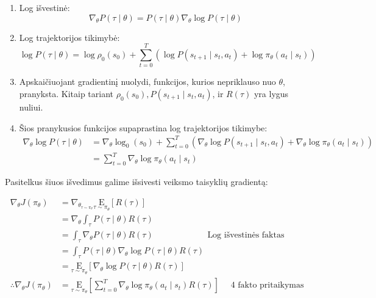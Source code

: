 \documentclass[a4paper, 12pt]{article}
\begin{document}
\begin{enumerate}
  \addtolength{\itemsep}{-0.5\baselineskip} 
  \item Log išvestinė:
\begin{equation}
\nabla_{\theta} P(\tau \mid \theta)=P(\tau \mid \theta) \nabla_{\theta} \log P(\tau \mid \theta)
\end{equation}
  \item Log trajektorijos tikimybė:
\begin{equation}
\log P(\tau \mid \theta)=\log \rho_{0}\left(s_{0}\right)+\sum_{t=0}^{T}\left(\log P\left(s_{t+1} \mid s_{t}, a_{t}\right)+\log \pi_{\theta}\left(a_{t} \mid s_{t}\right)\right)
\end{equation}
  \item Apskaičiuojant gradientinį nuolydi, funkcijos, kurios nepriklauso nuo $\theta$, pranyksta. Kitaip tariant $\rho_{0}\left(s_{0}\right), P\left(s_{t+1} \mid s_{t}, a_{t}\right)$, ir $R(\tau)$ yra lygus nuliui.
 \item Šios pranykusios funkcijos supaprastina log trajektorijos tikimybe:
\begin{equation}
\begin{aligned}
\nabla_{\theta} \log P(\tau \mid \theta) &=\nabla_{\theta} \log _{0}\left(s_{0}\right)+\sum_{t=0}^{T}\left(\nabla_{\theta} \log P\left(s_{t+1} \mid s_{t}, a_{t}\right)+\nabla_{\theta} \log \pi_{\theta}\left(a_{t} \mid s_{t}\right)\right) \\
&=\sum_{t=0}^{T} \nabla_{\theta} \log \pi_{\theta}\left(a_{t} \mid s_{t}\right)
\end{aligned}
\end{equation}
\end{enumerate}

Pasitelkus šiuos išvedimus galime išsivesti veiksmo taisyklių gradientą:

\begin{equation}
\begin{array}{rlr}
\label{megaVeiksmuGradientas}
\nabla_{\theta} J\left(\pi_{\theta}\right) & =\nabla_{\theta_{\tau \sim \pi_{\theta}}} \underset{\tau \sim \pi_{\theta}}{\mathrm{E}}[R(\tau)]  \\
& =\nabla_{\theta} \int_{\tau} P(\tau \mid \theta) R(\tau)  \\
& =\int_{\tau} \nabla_{\theta} P(\tau \mid \theta) R(\tau)  \quad \quad \quad \quad \quad \quad \text { Log išvestinės faktas } \\
& =\int_{\tau} P(\tau \mid \theta) \nabla_{\theta} \log P(\tau \mid \theta) R(\tau)  \\
& =\underset{\tau \sim \pi_{\theta}}{\mathrm{E}}\left[\nabla_{\theta} \log P(\tau \mid \theta) R(\tau)\right]  \\
\therefore \nabla_{\theta} J\left(\pi_{\theta}\right) & =\underset{\tau \sim \pi_{\theta}}{\mathrm{E}}\left[\sum_{t=0}^{T} \nabla_{\theta} \log \pi_{\theta}\left(a_{t} \mid s_{t}\right) R(\tau)\right] \quad \text { 4 fakto pritaikymas }
\end{array}
\end{equation}
\end{document}
